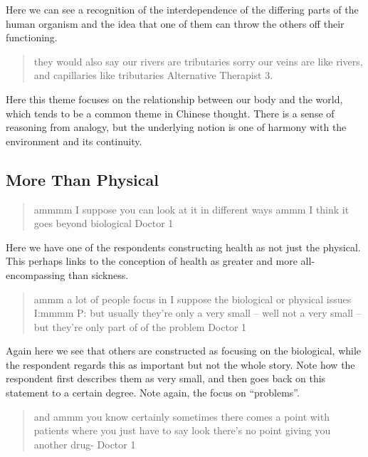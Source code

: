 Here we can see a recognition of the interdependence of the differing parts of the human organism and the idea that one of them can throw the others off their functioning. 



\begin{quotation}
  they would also say our rivers are tributaries sorry our veins are like rivers, and capillaries like tributaries 
Alternative Therapist 3. 
\end{quotation}

Here this theme focuses on the relationship between our body and the world, which tends to be a common theme in Chinese thought. There is a sense of reasoning from analogy, but the underlying notion is one of harmony with the environment and its continuity. 


\subsection{More Than Physical}
\label{sec:more-than-physical}

\begin{quotation}
  ammmm I suppose you can look at it in different ways ammm I think it goes beyond biological 
Doctor 1
\end{quotation}

Here we have one of the respondents constructing health as not just the physical. This perhaps links to the conception of health as greater and more all-encompassing than sickness. 

\begin{quotation}
  ammm a lot of people focus in I suppose the biological or physical issues
I:mmmm
P: but usually they're only a very small – well not a very small – but they're only part of of the problem
Doctor 1
\end{quotation}

Again here we see that others are constructed as focusing on the biological, while the respondent regards this as important but not the whole story. Note how the respondent first describes them as very small, and then goes back on this statement to a certain degree. Note again, the focus on ``problems''. 


\begin{quotation}
and ammm you know certainly sometimes there comes a point with patients where you just have to say look there's no point giving you another drug-
Doctor 1  
\end{quotation}


